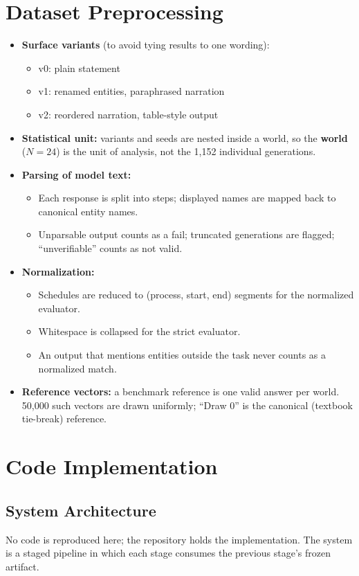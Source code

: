 \documentclass[11pt,a4paper]{article}
\begin{document}
\section{Dataset Preprocessing}
\begin{itemize}
\item \textbf{Surface variants} (to avoid tying results to one wording):
  \begin{itemize}
  \item v0: plain statement
  \item v1: renamed entities, paraphrased narration
  \item v2: reordered narration, table-style output
  \end{itemize}
\item \textbf{Statistical unit:} variants and seeds are nested inside a world, so the \textbf{world} ($N=24$) is the unit of analysis, not the 1,152 individual generations.
\item \textbf{Parsing of model text:}
  \begin{itemize}
  \item Each response is split into steps; displayed names are mapped back to canonical entity names.
  \item Unparsable output counts as a fail; truncated generations are flagged; ``unverifiable'' counts as not valid.
  \end{itemize}
\item \textbf{Normalization:}
  \begin{itemize}
  \item Schedules are reduced to (process, start, end) segments for the normalized evaluator.
  \item Whitespace is collapsed for the strict evaluator.
  \item An output that mentions entities outside the task never counts as a normalized match.
  \end{itemize}
\item \textbf{Reference vectors:} a benchmark reference is one valid answer per world. 50,000 such vectors are drawn uniformly; ``Draw 0'' is the canonical (textbook tie-break) reference.
\end{itemize}

\section{Code Implementation}
\subsection{System Architecture}
No code is reproduced here; the repository holds the implementation. The system is a staged pipeline in which each stage consumes the previous stage's frozen artifact.
\end{document}

